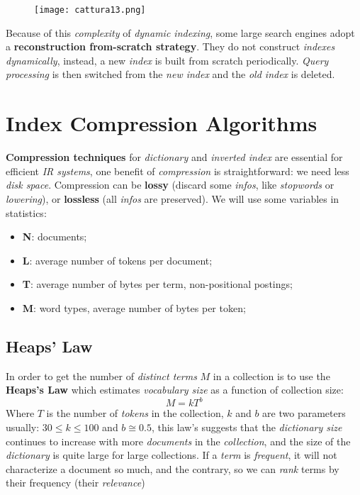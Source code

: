 \documentclass{article}
\begin{document}
\begin{figure}[H]
  \centering
  \texttt{[image: cattura13.png]}
\end{figure}
Because of this \emph{complexity} of \emph{dynamic indexing}, some large search engines adopt a \textbf{reconstruction from-scratch strategy}. They do not construct \emph{indexes dynamically}, instead, a new \emph{index} is built from scratch periodically. \emph{Query processing} is then switched from the \emph{new index} and the \emph{old index} is deleted.
\newpage
\section{Index Compression Algorithms}
\textbf{Compression techniques} for \emph{dictionary} and \emph{inverted index} are essential for efficient \emph{IR systems}, one benefit of \emph{compression} is straightforward: we need less \emph{disk space}. Compression can be \textbf{lossy} (discard some \emph{infos}, like \emph{stopwords} or \emph{lowering}), or \textbf{lossless} (all \emph{infos} are preserved). We will use some variables in statistics:
\begin{itemize}
\item \textbf{N}: documents;
\item \textbf{L}: average number of tokens per document;
\item \textbf{T}: average number of bytes per term, non-positional postings;
\item \textbf{M}: word types, average number of bytes per token;
\end{itemize}
\subsection{Heaps' Law}
In order to get the number of \emph{distinct terms} $M$ in a collection is to use the \textbf{Heaps's Law} which estimates \emph{vocabulary size} as a function of collection size:
\[ M = kT^b\]
Where $T$ is the number of \emph{tokens} in the collection, $k$ and $b$ are two parameters usually: $30 \leq k \leq 100$ and $b \cong 0.5$, this law's suggests that the \emph{dictionary size} continues to increase with more \emph{documents} in the \emph{collection}, and the size of the \emph{dictionary} is quite large for large collections. If a \emph{term} is \emph{frequent}, it will not characterize a document so much, and the contrary, so we can \emph{rank} terms by their frequency (their \emph{relevance})
\end{document}
